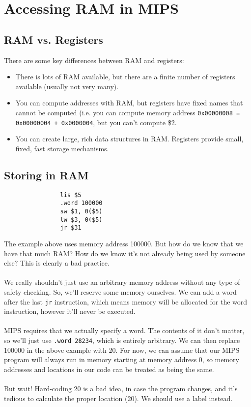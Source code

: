 \documentclass[]{article}
\theoremstyle{definition}
\begin{document}
	\section{Accessing RAM in MIPS}
		\subsection{RAM vs. Registers}
			There are some key differences between RAM and registers:
			\begin{itemize}
				\item There is lots of RAM available, but there are a finite number of registers available (usually not very many).
				\item You can compute addresses with RAM, but registers have fixed names that cannot be computed (i.e. you can compute memory address \verb|0x00000008 = 0x00000004 + 0x0000004|, but you can't compute \$2.
				\item You can create large, rich data structures in RAM. Registers provide small, fixed, fast storage mechanisms.
			\end{itemize}
		\subsection{Storing in RAM}
			\begin{verbatim}
				lis $5
				.word 100000
				sw $1, 0($5)
				lw $3, 0($5)
				jr $31
			\end{verbatim}
			
			The example above uses memory address 100000. But how do we know that we have that much RAM? How do we know it's not already being used by someone else? This is clearly a bad practice.
			\\ \\
			We really shouldn't just use an arbitrary memory address without any type of safety checking. So, we'll reserve some memory ourselves. We can add a word after the last \verb+jr+ instruction, which means memory will be allocated for the word instruction, however it'll never be executed.
			\\ \\
			MIPS requires that we actually specify a word. The contents of it don't matter, so we'll just use \verb+.word 28234+, which is entirely arbitrary. We can then replace 100000 in the above example with 20. For now, we can assume that our MIPS program will always run in memory starting at memory address 0, so memory addresses and locations in our code can be treated as being the same.
			\\ \\
			But wait! Hard-coding 20 is a bad idea, in case the program changes, and it's tedious to calculate the proper location (20). We should use a label instead.
\end{document}
